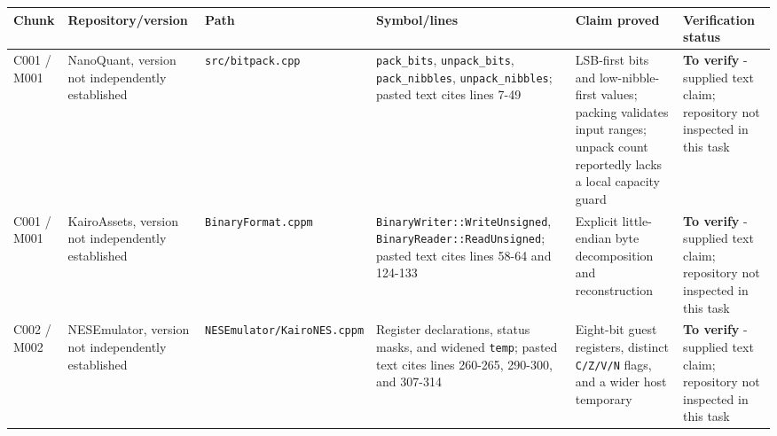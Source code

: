 {\def\LTcaptype{none} %
\begin{longtable}[]{@{}
  >{\raggedleft\arraybackslash}p{}
  >{\raggedright\arraybackslash}p{}
  >{\raggedright\arraybackslash}p{}
  >{\raggedright\arraybackslash}p{}
  >{\raggedright\arraybackslash}p{}
  >{\raggedright\arraybackslash}p{}@{}}
\toprule\noalign{}
\begin{minipage}[b]{\linewidth}\raggedleft
Chunk
\end{minipage} & \begin{minipage}[b]{\linewidth}\raggedright
Repository/version
\end{minipage} & \begin{minipage}[b]{\linewidth}\raggedright
Path
\end{minipage} & \begin{minipage}[b]{\linewidth}\raggedright
Symbol/lines
\end{minipage} & \begin{minipage}[b]{\linewidth}\raggedright
Claim proved
\end{minipage} & \begin{minipage}[b]{\linewidth}\raggedright
Verification status
\end{minipage} \\
\midrule\noalign{}
\endhead
\bottomrule\noalign{}
\endlastfoot
C001 / M001 & NanoQuant, version not independently established & \texttt{src/bitpack.cpp} & \texttt{pack\_bits}, \texttt{unpack\_bits}, \texttt{pack\_nibbles}, \texttt{unpack\_nibbles}; pasted text cites lines 7-49 & LSB-first bits and low-nibble-first values; packing validates input ranges; unpack count reportedly lacks a local capacity guard & \textbf{To verify} - supplied text claim; repository not inspected in this task \\
C001 / M001 & KairoAssets, version not independently established & \texttt{BinaryFormat.cppm} & \texttt{BinaryWriter::WriteUnsigned}, \texttt{BinaryReader::ReadUnsigned}; pasted text cites lines 58-64 and 124-133 & Explicit little-endian byte decomposition and reconstruction & \textbf{To verify} - supplied text claim; repository not inspected in this task \\
C002 / M002 & NESEmulator, version not independently established & \texttt{NESEmulator/KairoNES.cppm} & Register declarations, status masks, and widened \texttt{temp}; pasted text cites lines 260-265, 290-300, and 307-314 & Eight-bit guest registers, distinct \texttt{C/Z/V/N} flags, and a wider host temporary & \textbf{To verify} - supplied text claim; repository not inspected in this task \\

\end{longtable}}
